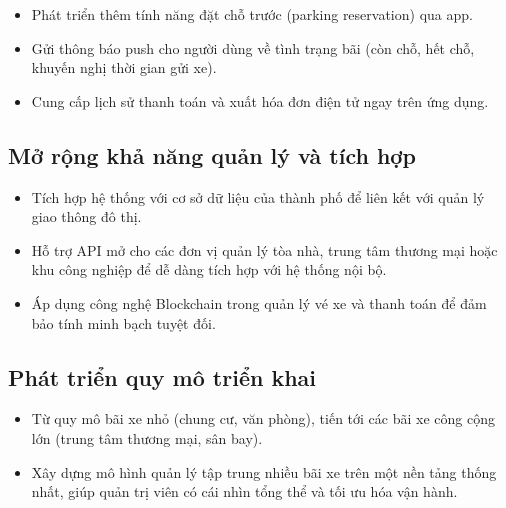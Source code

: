 \begin{itemize}
    \item Phát triển thêm tính năng đặt chỗ trước (parking reservation) qua app.

    \item Gửi thông báo push cho người dùng về tình trạng bãi (còn chỗ, hết chỗ, khuyến nghị thời gian gửi xe).

    \item Cung cấp lịch sử thanh toán và xuất hóa đơn điện tử ngay trên ứng dụng.
\end{itemize}


\subsection{Mở rộng khả năng quản lý và tích hợp}

\begin{itemize}
    \item Tích hợp hệ thống với cơ sở dữ liệu của thành phố để liên kết với quản lý giao thông đô thị.

    \item Hỗ trợ API mở cho các đơn vị quản lý tòa nhà, trung tâm thương mại hoặc khu công nghiệp để dễ dàng tích hợp với hệ thống nội bộ.

    \item Áp dụng công nghệ Blockchain trong quản lý vé xe và thanh toán để đảm bảo tính minh bạch tuyệt đối.
\end{itemize}

\subsection{Phát triển quy mô triển khai}

\begin{itemize}
    \item Từ quy mô bãi xe nhỏ (chung cư, văn phòng), tiến tới các bãi xe công cộng lớn (trung tâm thương mại, sân bay).

    \item Xây dựng mô hình quản lý tập trung nhiều bãi xe trên một nền tảng thống nhất, giúp quản trị viên có cái nhìn tổng thể và tối ưu hóa vận hành.
\end{itemize}

